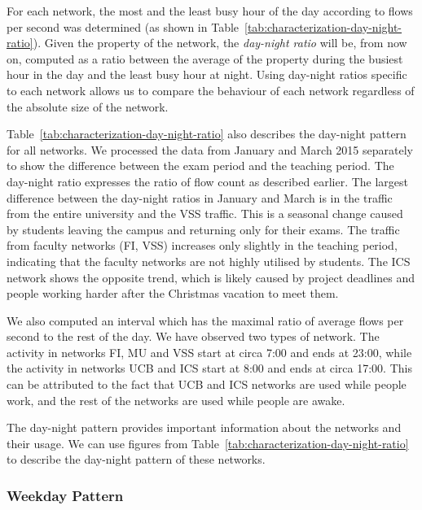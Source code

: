 For each network, the most and the least busy hour of the day according to flows per second was determined (as shown in Table~\ref{tab:characterization-day-night-ratio}). Given the property of the network, the \textit{day-night ratio} will be, from now on, computed as a ratio between the average of the property during the busiest hour in the day and the least busy hour at night. Using day-night ratios specific to each network allows us to compare the behaviour of each network regardless of the absolute size of the network. 

Table~\ref{tab:characterization-day-night-ratio} also describes the day-night pattern for all networks. We processed the data from January and March 2015 separately to show the difference between the exam period and the teaching period. The day-night ratio expresses the ratio of flow count as described earlier. The largest difference between the day-night ratios in January and March is in the traffic from the entire university and the VSS traffic. This is a seasonal change caused by students leaving the campus and returning only for their exams. The traffic from faculty networks (FI, VSS) increases only slightly in the teaching period, indicating that the faculty networks are not highly utilised by students. The ICS network shows the opposite trend, which is likely caused by project deadlines and people working harder after the Christmas vacation to meet them.

We also computed an interval which has the maximal ratio of average flows per second to the rest of the day. We have observed two types of network. The activity in networks FI, MU and VSS start at circa 7:00 and ends at 23:00, while the activity in networks UCB and ICS start at 8:00 and ends at circa 17:00. This can be attributed to the fact that UCB and ICS networks are used while people work, and the rest of the networks are used while people are awake.

The day-night pattern provides important information about the networks and their usage. We can use figures from Table~\ref{tab:characterization-day-night-ratio} to describe the day-night pattern of these networks.

\subsubsection{Weekday Pattern}

